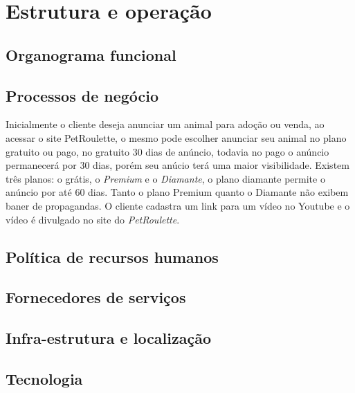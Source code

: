 \chapter{Estrutura e operação} 

\cite{slack2002administração}

\cite{nigel2009operations}

\section{Organograma funcional}

\section{Processos de negócio}
	Inicialmente o cliente deseja anunciar um animal para adoção ou venda, ao acessar o site PetRoulette, o mesmo pode escolher anunciar seu animal no plano gratuito ou pago, no gratuito 30 dias de anúncio, todavia no pago o anúncio permanecerá por 30 dias, porém seu anúcio terá uma maior visibilidade. Existem três planos: o grátis, o \emph{Premium} e o \emph{Diamante}, o plano diamante permite o anúncio por até 60 dias. Tanto o plano Premium quanto o Diamante não exibem baner de propagandas. O cliente cadastra um link para um vídeo no Youtube e o vídeo é divulgado no site do \emph{PetRoulette}.


\section{Política de recursos humanos}

\section{Fornecedores de serviços}

\section{Infra-estrutura e localização}

\section{Tecnologia}
